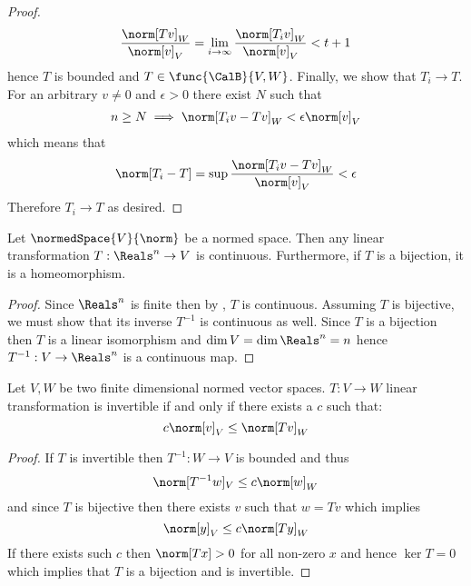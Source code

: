 \begin{proof}
    \begin{equation*}
        \dfrac{\norm[Tv]_W}{\norm[v]_V} = \lim_{i \to \infty}  \dfrac{\norm[T_i v]_W}{\norm[v]_V} < t + 1
    \end{equation*}
    hence \(T\) is bounded and \(T \in \func{\CalB}{V,W}\). Finally, we show that \(T_i \to T\). For an arbitrary \(v \neq 0\) and \(\epsilon > 0\) there exist \(N\) such that
    \begin{align*}
        n \geq N \implies \norm[T_i v - Tv]_W < \epsilon \norm[v]_V
    \end{align*}
    which means that
    \begin{equation*}
        \norm[T_i - T] = \sup \dfrac{\norm[T_i v - Tv]_W}{\norm[v]_V} < \epsilon
    \end{equation*}
    Therefore \(T_i \to T\) as desired.
\end{proof}

\begin{theorem}
    Let \(\normedSpace{V}{\norm}\) be a normed space. Then any linear transformation \(T: \Reals^n \to V\) is continuous. Furthermore, if \(T\) is a bijection, it is a homeomorphism.
\end{theorem}

\begin{proof}
    Since \(\Reals^n\) is finite then by , \(T\) is continuous. Assuming \(T\) is bijective, we must show that its inverse \(T^{-1}\) is continuous as well. Since \(T\) is a bijection then \(T\) is a linear isomorphism and \(\dim V = \dim \Reals^n = n\) hence \(T^{-1}: V \to \Reals^n\) is a continuous map.
\end{proof}


\begin{theorem} \label{th:LinearInvertibility}
    Let \(V,W\) be two finite dimensional normed vector spaces. \(T : V \to W\) linear transformation is invertible if and only if there exists a \(c\) such that:
    \begin{equation*}
        c \norm[v]_V \leq \norm[Tv]_W
    \end{equation*}
\end{theorem}

\begin{proof}
    If \(T\) is invertible then \(T^{-1} : W \to V \) is bounded and thus
    \begin{equation*}
        \norm[T^{-1}w]_V \leq c \norm[w]_W
    \end{equation*}
    and since \(T\) is bijective then there exists \(v\) such that \(w = Tv\) which implies
    \begin{equation*}
        \norm[y]_V \leq c\norm[Ty]_W
    \end{equation*}
    If there exists such \(c\) then \(\norm[Tx] > 0\) for all non-zero \(x\) and hence \(\ker T  = 0\) which implies that \(T\) is a bijection and is invertible.
\end{proof}

